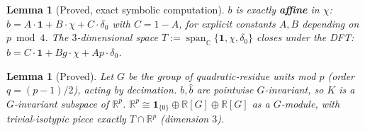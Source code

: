 \documentclass[11pt]{article}
\theoremstyle{plain}
\newtheorem{lemma}[theorem]{Lemma}
\theoremstyle{definition}
\theoremstyle{remark}
\newcommand{\R}{\mathbb R}
\newcommand{\C}{\mathbb C}
\begin{document}
\begin{lemma}[Proved, exact symbolic computation]\label{lem:bjaffine}
$b$ is exactly \textbf{affine} in $\chi$: $b=A\cdot\mathbf1+B\cdot\chi+C\cdot\delta_0$
with $C=1-A$, for explicit constants $A,B$ depending on $p\bmod4$. The
$3$-dimensional space $T:=\operatorname{span}_\C\{\mathbf1,\chi,\delta_0\}$
closes under the DFT: $\hat b=C\cdot\mathbf1+Bg\cdot\chi+Ap\cdot\delta_0$.
\end{lemma}

\begin{lemma}[Proved]\label{lem:bjequiv}
Let $G$ be the group of quadratic-residue units mod $p$ (order $q=(p-1)/2$),
acting by decimation. $b,\hat b$ are pointwise $G$-invariant, so $K$ is a
$G$-invariant subspace of $\R^p$. $\R^p\cong\mathbf1_{\{0\}}\oplus\R[G]\oplus\R[G]$
as a $G$-module, with trivial-isotypic piece exactly $T\cap\R^p$
(dimension $3$).
\end{lemma}
\end{document}

